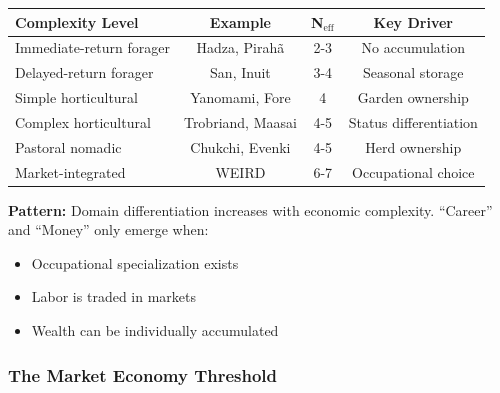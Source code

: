 \begin{center}
\begin{tabular}{@{}lccc@{}}
\toprule
\textbf{Complexity Level} & \textbf{Example} & \textbf{N$_{\text{eff}}$} & \textbf{Key Driver} \\
\midrule
Immediate-return forager & Hadza, Pirahã & 2-3 & No accumulation \\
Delayed-return forager & San, Inuit & 3-4 & Seasonal storage \\
Simple horticultural & Yanomami, Fore & 4 & Garden ownership \\
Complex horticultural & Trobriand, Maasai & 4-5 & Status differentiation \\
Pastoral nomadic & Chukchi, Evenki & 4-5 & Herd ownership \\
\midrule
Market-integrated & WEIRD & 6-7 & Occupational choice \\
\bottomrule
\end{tabular}
\end{center}

\textbf{Pattern:} Domain differentiation increases with economic complexity. ``Career'' and ``Money'' only emerge when:
\begin{itemize}[nosep]
\item Occupational specialization exists
\item Labor is traded in markets
\item Wealth can be individually accumulated
\end{itemize}

\subsubsection{The Market Economy Threshold}

